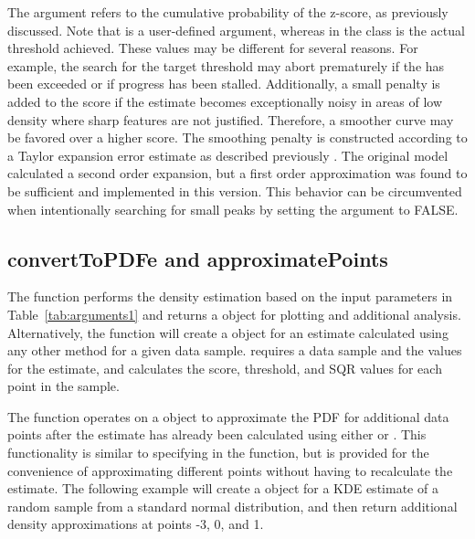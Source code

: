 The  argument refers to the cumulative probability of the z-score, as previously discussed. Note that  is a user-defined argument, whereas  in the  class is the actual threshold achieved. These values may be different for several reasons.  For example, the search for the target threshold may abort prematurely if the  has been exceeded or if progress has been stalled.  Additionally, a small penalty is added to the score if the estimate becomes exceptionally noisy in areas of low density where sharp features are not justified. Therefore, a smoother curve may be favored over a higher score. The smoothing penalty is constructed according to a Taylor expansion error estimate as
described previously \citep{mem2}. The original model calculated a second order expansion, but a first order approximation was found to be sufficient and implemented in this version. This behavior can be circumvented when intentionally searching for small peaks by setting the  argument to FALSE.

\subsection{convertToPDFe and approximatePoints} \label{convert}

The  function performs the density estimation based on the input parameters in Table~\ref{tab:arguments1} and returns a  object for plotting and additional analysis. Alternatively, the  function will create a  object for an estimate calculated using any other method for a given data sample.  requires a data sample and the  values for the estimate, and calculates the score, threshold, and SQR values for each point in the sample.

The  function operates on a  object to approximate the PDF for additional data points after the estimate has already been calculated using either  or . This functionality is similar to specifying  in the  function, but is provided for the convenience of approximating different points without having to recalculate the estimate. The following example will create a  object for a KDE estimate of a random sample from a standard normal distribution, and then return additional density approximations at points -3, 0, and 1.

